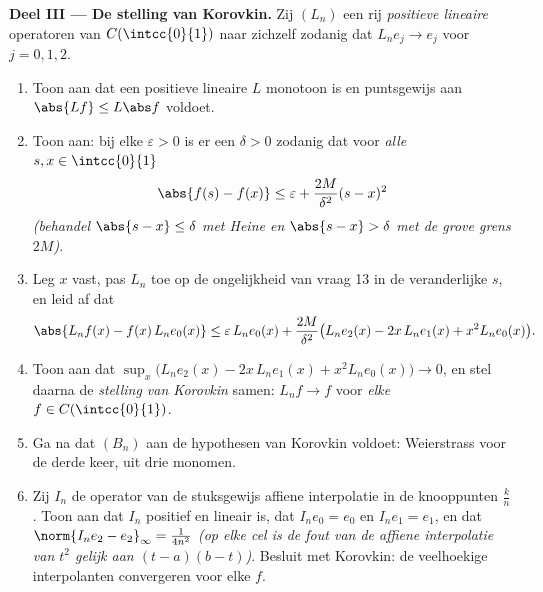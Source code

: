 \begin{problem}
\medskip
\noindent\textbf{Deel III --- De stelling van Korovkin.} Zij
$(L_n)$ een rij \emph{positieve lineaire} operatoren van
$C(\intcc{0}{1})$ naar zichzelf zodanig dat $L_ne_j \to e_j$
 voor $j = 0, 1, 2$.
\begin{enumerate}[resume]
  \item Toon aan dat een positieve lineaire $L$ monotoon is en
        puntsgewijs aan $\abs{Lf} \leq L\abs f$ voldoet.
  \item Toon aan: bij elke $\varepsilon > 0$ is er een $\delta > 0$
        zodanig dat voor \emph{alle} $s, x \in \intcc{0}{1}$
        \[
        \abs{f(s) - f(x)} \leq \varepsilon +
        \frac{2M}{\delta^2}(s - x)^2
        \]
        \emph{(behandel $\abs{s - x} \leq \delta$ met Heine en
        $\abs{s-x} > \delta$ met de grove grens $2M$)}.
  \item Leg $x$ vast, pas $L_n$ toe op de ongelijkheid van vraag 13
        in de veranderlijke $s$, en leid af dat
        \[
        \abs{L_nf(x) - f(x)\,L_ne_0(x)}
        \leq \varepsilon\,L_ne_0(x) + \frac{2M}{\delta^2}
        \bigl(L_ne_2(x) - 2x\,L_ne_1(x) + x^2 L_ne_0(x)\bigr).
        \]
  \item Toon aan dat $\sup_x \bigl(L_ne_2(x) - 2x\,L_ne_1(x) + x^2
        L_ne_0(x)\bigr) \to 0$, en stel daarna de \emph{stelling
        van Korovkin} samen: $L_nf \to f$  voor
        \emph{elke} $f \in C(\intcc{0}{1})$.
  \item Ga na dat $(B_n)$ aan de hypothesen van Korovkin voldoet:
        Weierstrass voor de derde keer, uit drie monomen.
  \item Zij $I_n$ de operator van de stuksgewijs affiene
        interpolatie in de knooppunten $\frac kn$. Toon aan dat
        $I_n$ positief en lineair is, dat $I_ne_0 = e_0$ en
        $I_ne_1 = e_1$, en dat $\norm{I_ne_2 - e_2}_\infty =
        \frac{1}{4n^2}$ \emph{(op elke cel is de fout van de
        affiene interpolatie van $t^2$ gelijk aan $(t - a)(b -
        t)$)}. Besluit met Korovkin: de veelhoekige interpolanten
        convergeren  voor elke  $f$.
\end{enumerate}


\end{problem}
